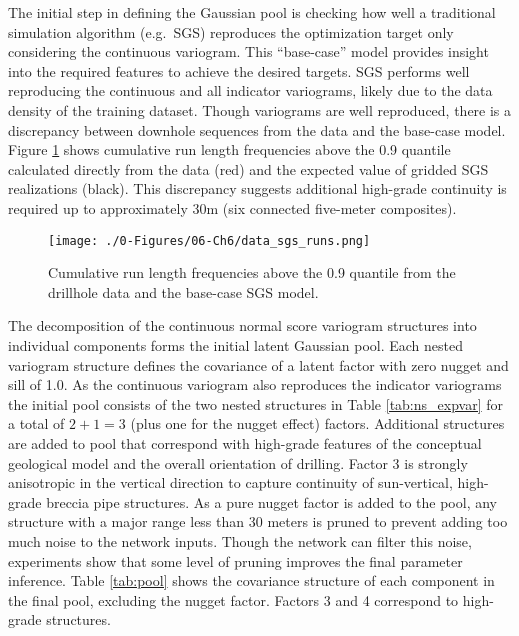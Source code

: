 The initial step in defining the Gaussian pool is checking how well a traditional simulation algorithm (e.g.\ \gls{SGS}) reproduces the optimization target only considering the continuous variogram. This ``base-case'' model provides insight into the required features to achieve the desired targets. \Gls{SGS} performs well reproducing the continuous and all indicator variograms, likely due to the data density of the training dataset. Though variograms are well reproduced, there is a discrepancy between downhole sequences from the data and the base-case model. Figure \ref{fig:data_sgs_runs} shows cumulative run length frequencies above the 0.9 quantile calculated directly from the data (red) and the expected value of gridded \gls{SGS} realizations (black). This discrepancy suggests additional high-grade continuity is required up to approximately 30m (six connected five-meter composites).

\begin{figure}[htb!]
    \centering
    \texttt{[image: ./0-Figures/06-Ch6/data\_sgs\_runs.png]}
    \caption{Cumulative run length frequencies above the 0.9 quantile from the drillhole data and the base-case \gls{SGS} model.}
    \label{fig:data_sgs_runs}
\end{figure}

The decomposition of the continuous normal score variogram structures into individual components forms the initial latent Gaussian pool. Each nested variogram structure defines the covariance of a latent factor with zero nugget and sill of 1.0. As the continuous variogram also reproduces the indicator variograms the initial pool consists of the two nested structures in Table \ref{tab:ns_expvar} for a total of $2 + 1 = 3$ (plus one for the nugget effect) factors. Additional structures are added to pool that correspond with high-grade features of the conceptual geological model and the overall orientation of drilling. Factor 3 is strongly anisotropic in the vertical direction to capture continuity of sun-vertical, high-grade breccia pipe structures. As a pure nugget factor is added to the pool, any structure with a major range less than 30 meters is pruned to prevent adding too much noise to the network inputs. Though the network can filter this noise, experiments show that some level of pruning improves the final parameter inference. Table \ref{tab:pool} shows the covariance structure of each component in the final pool, excluding the nugget factor. Factors 3 and 4 correspond to high-grade structures.


